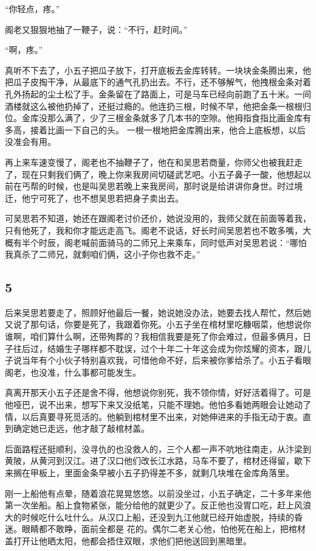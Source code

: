 “你轻点，疼。”

阁老又狠狠地抽了一鞭子，说：“不行，赶时间。”

“啊，疼。”

真听不下去了，小五子把瓜子放下，打开底板去金库转转。一块块金条腾出来，他把瓜子皮掏干净，从最底下的通气孔扔出去。不行，还不够解气，他拽根金条对着孔外扬起的尘土松了手。金条留在了路面上，可是马车已经向前跑了五十米。一间酒楼就这么被他扔掉了，还挺过瘾的。他连扔三根，时候不早，他把金条一根根归位。金库没那么满了，少了三根金条就多了几本书的空隙。他拇指食指比画金库有多高，接着比画一下自己的头。
一根一根地把金库腾出来，他合上底板想，以后没准会有用。

再上来车速变慢了，阁老也不抽鞭子了，他在和吴思若商量，你师父也被我赶走了，现在只剩我们俩了，晚上你来我房间切磋武艺吧。小五子鼻子一酸，他想起以前在丐帮的时候，也是叫吴思若晚上来我房间，那时说是给讲讲你身世。时过境迁，他宁可死了，也不想吴思若把身子卖出去。

可吴思若不知道，她还在跟阁老讨价还价，她说没用的，我师父就在前面等着我，只有他死了，我和你才能远走高飞。阁老不说话，好长时间吴思若也不敢多嘴，大概有半个时辰，阁老喊前面骑马的二师兄上来乘车，同时低声对吴思若说：“哪怕我真杀了二师兄，就剩咱们俩，这小子你也救不走。”
\newline

{\centering\subsection{5}}

后来吴思若要走了，照顾好他最后一餐，她说她没办法，她要去找人帮忙，然后她又说了那句话，你要是死了，我跟着你死。小五子坐在棺材里吃糠咽菜，他想说你谁啊，咱们算什么啊，还带殉葬的？我相信我要是死了你会难过，但最多俩月，日子往后过，结婚生子哪样都不耽误，过个十年二十年这会成为你炫耀的资本，跟儿子说当年有个小伙子特别喜欢我，可惜他命不好，后来被你爹给杀了。小五子看眼阁老，也没准，什么事都可能发生。

真离开那天小五子还是舍不得，他想说你别死，我不领你情，好好活着得了。可是他哑巴，说不出来，想写下来又没纸笔，只能不理她。他怕多看她两眼会让她动了情，以后真要寻死觅活的。他躺到棺材里不出来，对她伸进来的手指无动于衷。直到确定她已走远，他才敲了敲棺材盖。

后面路程还挺顺利，没寻仇的也没救人的，三个人都一声不吭地往南走，从汴梁到黄陂，从黄河到汉江。进了汉口他们改长江水路，马车不要了，棺材还得留，歇下来搁在甲板上，里面金条早被小五子扔得差不多，就剩几块堆在金库角落里。

刚一上船他有点晕，随着浪花晃晃悠悠。以前没坐过，小五子确定，二十多年来他第一次坐船。船上食物紧张，能分给他的就更少了。反正他也没胃口吃，赶上风浪大的时候吃什么吐什么。从汉口上船，还没到九江他就已经开始虚脱，持续的昏迷。眼睛都不敢睁，面前全都是
花的。偶尔二老关心他，怕他死在船上，把棺材盖打开让他晒太阳，他都会捂住双眼，求他们把他送回到黑暗里。

